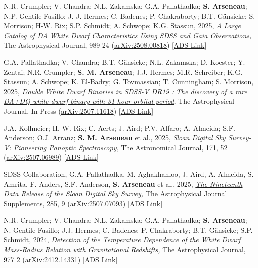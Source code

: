 \documentclass[11pt]{article}       %
\newcommand{\doi}[2]{\emph{\href{http://dx.doi.org/#1}{{#2}}}}
\newcommand{\arxiv}[1]{{\href{http://arxiv.org/abs/#1}{arXiv:{#1}}}}
\begin{document}
\begin{etaremune}
    \item N.R. Crumpler; V. Chandra; N.L. Zakamska; G.A. Pallathadka; \textbf{S. Arseneau}; N.P. Gentile Fusillo; J. J. Hermes; C. Badenes; P. Chakraborty; B.T. G\"ansicke; S. Morrison; H-W. Rix; S.P. Schmidt; A. Schwope; K.G. Stassun, 2025, \doi{10.3847/1538-4357/ade9a9}{A Large Catalog of DA White Dwarf Characteristics Using SDSS and Gaia Observations,} The Astrophysical Journal, 989 24 (\arxiv{2508.00818}) [\href{https://ui.adsabs.harvard.edu/abs/2025ApJ...989...24C}{ADS Link}]
  
    \item G.A. Pallathadka; V. Chandra; B.T. G\"ansicke; N.L. Zakamska; D. Koester; Y. Zentai; N.R. Crumpler; \textbf{S. M. Arseneau}; J.J. Hermes; M.R. Schreiber; K.G. Stassun; A. Schwope; K. El-Badry; G. Tovmassian; T. Cunningham; S. Morrison, 2025, \doi{10.3847/1538-4357/ae3c9f}{Double White Dwarf Binaries in SDSS-V DR19 : The discovery of a rare DA+DQ white dwarf binary with 31 hour orbital period,} The Astrophysical Journal, In Press (\arxiv{2507.11618}) [\href{https://ui.adsabs.harvard.edu/abs/2025arXiv250711618A}{ADS Link}]
  
    \item J.A. Kollmeier; H.-W. Rix; C. Aerts; J. Aird; P.V. Alfaro; A. Almeida; S.F. Anderson; O.J. Arranz; \textbf{S. M. Arseneau} et al., 2025, \doi{10.3847/1538-3881/ae0576}{Sloan Digital Sky Survey-V: Pioneering Panoptic Spectroscopy,} The Astronomical Journal, 171, 52 (\arxiv{2507.06989}) [\href{https://ui.adsabs.harvard.edu/abs/2026AJ....171...52K/abstract}{ADS Link}]
  
    \item SDSS Collaboration, G.A. Pallathadka, M. Aghakhanloo, J. Aird, A. Almeida, S. Amrita, F. Anders, S.F. Anderson, \textbf{S. Arseneau} et al., 2025, \doi{10.3847/1538-4365/ae4697}{The Nineteenth Data Release of the Sloan Digital Sky Survey,} The Astrophysical Journal Supplements, 285, 9 (\arxiv{2507.07093}) [\href{https://ui.adsabs.harvard.edu/abs/2026ApJS..285....9S}{ADS Link}]
  
    \item N.R. Crumpler; V. Chandra; N.L. Zakamska; G.A. Pallathadka; \textbf{S. Arseneau}; N. Gentile Fusillo; J.J. Hermes; C. Badenes; P. Chakraborty; B.T. Gänsicke; S.P. Schmidt, 2024, \doi{10.3847/1538-4357/ad8ddc}{Detection of the Temperature Dependence of the White Dwarf Mass-Radius Relation with Gravitational Redshifts,} The Astrophysical Journal, 977 2 (\arxiv{2412.14331}) [\href{https://ui.adsabs.harvard.edu/abs/2024ApJ...977..237C}{ADS Link}]
  

\end{etaremune}
\end{document}
